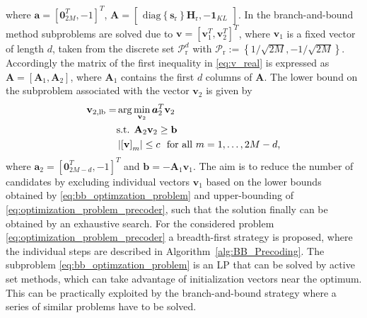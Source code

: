 \documentclass[journal,comsoc]{IEEEtran}
\begin{document}
where $\boldsymbol{a}=[\boldsymbol{0}_{2M}^T,-1]^T$, 
$\mathbf{A}= \begin{bmatrix}    \mathrm{diag} \left\{ \mathbf{s}_{\textrm{r}} \right\} \mathbf{H}_{\textrm{r}}, -\boldsymbol{1}_{K L}     \end{bmatrix}$.
In the branch-and-bound method subproblems are solved due to $\mathbf{v}=\left[\mathbf{v}_1^T,\mathbf{v}_2^T   \right]^T$, where $\mathbf{v}_1$ is a fixed vector of length $d$, taken from the discrete set $\mathcal{P}_{\mathrm{r}}^d$ with $\mathcal{P}_{\mathrm{r}}:=\left\{ 1/\sqrt{2M}, -1/\sqrt{2M}  \right\}$.
Accordingly the matrix of the first inequality in \eqref{eq:v_real} is expressed as $\mathbf{A}=\left[\mathbf{A}_1,  \mathbf{A}_2   \right]$, where $\mathbf{A}_1$ contains the first $d$ columns of $\mathbf{A}$.
The lower bound on the subproblem associated with the vector $\mathbf{v}_2$ is given by 
\begin{align}
\label{eq:bb_optimzation_problem}
{\mathbf{v}_{2,\textrm{lb}}}=& \arg\min_{\mathbf{v}_2}  \boldsymbol{a}_2^T \mathbf{v}_2 \\
& \textrm{s.t. } \mathbf{A}_2 \mathbf{v}_2 \geq  \mathbf{b}    \notag \\
&     \left|\left[\mathbf{v}\right]_{m}\right|   \leq  c  \ \  \textrm{for all } m=1,\ldots,2M-d     \textrm{,} \notag
\end{align}   
where $\boldsymbol{a}_2=\left[ \boldsymbol{0}_{2M-d}^T,-1 \right]^T$ and $\mathbf{b}=-\mathbf{A}_1 \mathbf{v}_1$. 
The aim is to reduce the number of candidates by excluding individual vectors $\mathbf{v}_1$ based on the lower bounds obtained by \eqref{eq:bb_optimzation_problem} and upper-bounding of \eqref{eq:optimization_problem_precoder}, such that the solution finally can be obtained by an exhaustive search.
For the considered problem \eqref{eq:optimization_problem_precoder} a breadth-first strategy is proposed, where the individual steps are described in Algorithm~\ref{alg:BB_Precoding}. The subproblem \eqref{eq:bb_optimzation_problem} is an LP that can be solved by active set methods, which can take advantage of initialization vectors near the optimum. This can be practically exploited by the branch-and-bound strategy where a series of similar problems have to be solved.
\end{document}
